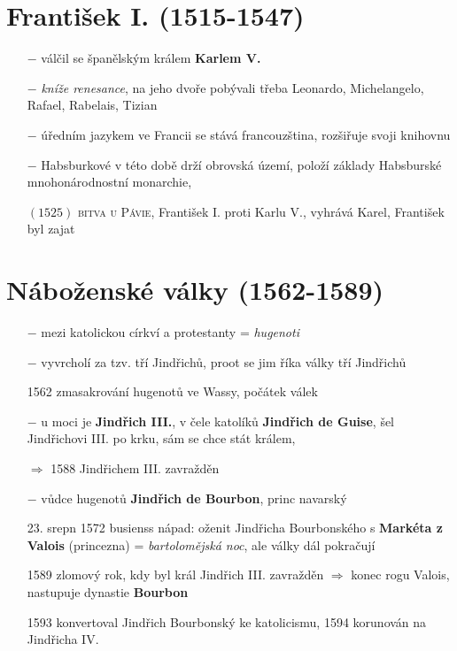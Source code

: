 \documentclass{article}
\begin{document}
\section*{František I. (1515-1547)}
\begin{itemize}
    \vspace{-0.5em}
    \setlength\itemsep{0.15em}
    \item[$-$] válčil se španělským králem \textbf{Karlem V.}
    \item[$-$] \textit{kníže renesance}, na jeho dvoře pobývali třeba Leonardo, Michelangelo, Rafael, Rabelais, Tizian
    \item[$-$] úředním jazykem ve Francii se stává francouzština, rozšiřuje svoji knihovnu
    \item[$-$] Habsburkové v této době drží obrovská území, položí základy Habsburské mnohonárodnostní monarchie, 
    \item[$(1525)$]\textsc{bitva u Pávie}, František I. proti Karlu V., vyhrává Karel, František byl zajat
\end{itemize}


\section*{Náboženské války (1562-1589)}
\begin{itemize}
    \vspace{-0.5em}
    \setlength\itemsep{0.15em}
    \item[$-$] mezi katolickou církví a protestanty = \textit{hugenoti}
    \item[$-$] vyvrcholí za tzv. tří Jindřichů, proot se jim říka války tří Jindřichů
    \item[1562] zmasakrování hugenotů ve Wassy, počátek válek
    \item[$-$] u moci je \textbf{Jindřich III.}, v čele katolíků \textbf{Jindřich de Guise}, šel Jindřichovi III. po krku, sám se chce stát králem,
    \item[$\Rightarrow$] 1588 Jindřichem III. zavražděn
    \item[$-$] vůdce hugenotů \textbf{Jindřich de Bourbon}, princ navarský
    \item[23. srepn 1572] busienss nápad: oženit Jindřicha Bourbonského s \textbf{Markéta z Valois} (princezna) = \textit{bartolomějská noc}, ale války dál pokračují
    \item[1589] zlomový rok, kdy byl král Jindřich III. zavražděn $\Rightarrow$ konec rogu Valois, nastupuje dynastie \textbf{Bourbon}
    \item[1593] konvertoval Jindřich Bourbonský ke katolicismu, 1594 korunován na Jindřicha IV.
\end{itemize}
\end{document}
